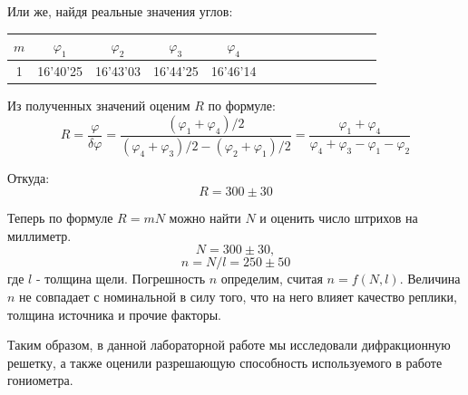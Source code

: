 \documentclass[14pt]{article}
\begin{document}
Или же, найдя реальные значения углов:

\begin{center}
\begin{tabular}{|c|c|c|c|c|c|c|c|c|c|c|c|c|c|}
\hline
$m$	&	$\varphi_1$	&	$\varphi_2$	&	$\varphi_3$	&	$\varphi_4$	\\
\hline
1	&	16'40'25	&	16'43'03	&	16'44'25	&	16'46'14	\\
\hline
\end{tabular}
\end{center}

Из полученных значений оценим $R$ по формуле:
$$
	R = \frac{\varphi}{\delta\varphi} = \frac{(\varphi_1 + \varphi_4)/2}{(\varphi_4+\varphi_3)/2 - (\varphi_2+\varphi_1)/2} = 
	    \frac{\varphi_1 + \varphi_4}{\varphi_4+\varphi_3 - \varphi_1-\varphi_2}
$$

Откуда:
$$
	R = 300 \pm 30
$$

Теперь по формуле $R = mN$ можно найти $N$ и оценить число штрихов на миллиметр.
$$
	N = 300 \pm 30,
$$
$$
	n = N/l = 250 \pm 50
$$
\noindent где $l$ - толщина щели. Погрешность $n$ определим, считая $n = f(N, l)$. Величина $n$ не совпадает с номинальной в силу того, что на него влияет качество реплики, толщина источника и прочие факторы.

\newpage
Таким образом, в данной лабораторной работе мы исследовали дифракционную решетку, а также оценили разрешающую способность используемого в работе гониометра.
\end{document}
